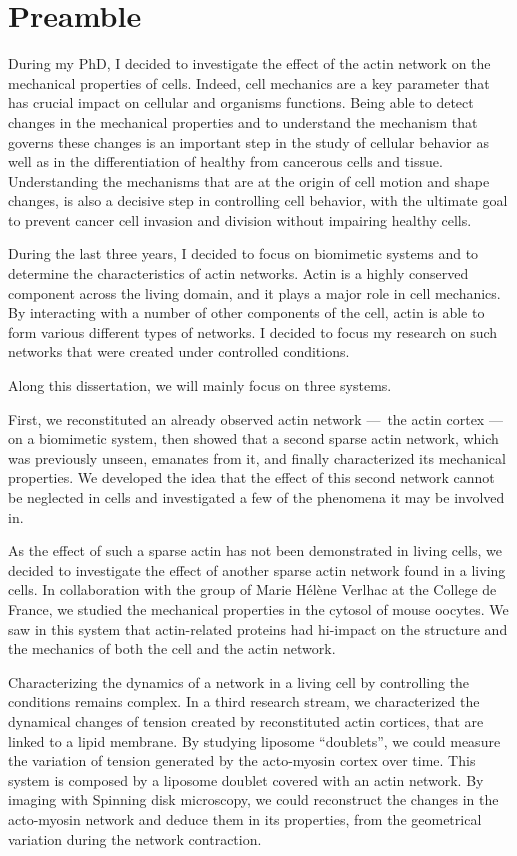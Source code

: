 \documentclass[A4paperpaper,11pt,english]{sphinxmanual}
\begin{document}
\chapter*{Preamble}
         
\label{index-latex::doc}\label{index-latex:preamble}
During my PhD, I decided to investigate the effect of the actin network on the
mechanical properties of cells. Indeed, cell mechanics are a key parameter that
has crucial impact on cellular and organisms functions. Being able to detect
changes in the mechanical properties and to understand the mechanism that
governs these changes is an important step in the study of cellular behavior as
well as in the differentiation of healthy from cancerous cells and tissue.
Understanding the mechanisms that are at the origin of cell motion and shape
changes, is also a decisive step in controlling cell behavior, with the ultimate
goal to prevent cancer cell invasion and division without impairing healthy
cells.

During the last three years, I decided to focus on biomimetic systems and
to determine the characteristics of actin networks. Actin is a highly conserved
component across the living domain, and it plays a major role in cell
mechanics. By interacting with a number of other components of the cell, actin
is able to form various different types of networks. I decided to focus my research on such networks that were created under
controlled conditions.

Along this dissertation, we will mainly focus on three systems.

First, we reconstituted an already observed actin network — the actin
cortex — on a biomimetic system, then showed that a
second sparse actin network, which was previously unseen, emanates from it, and finally characterized its mechanical
properties. We developed the idea that the effect of this second network cannot
be neglected in cells and investigated a few of the phenomena it may be involved
in.

As the effect of such a sparse actin has not been demonstrated in living cells, we decided to
investigate the effect of another sparse actin network found in a living cells. In
collaboration with the group of Marie Hélène Verlhac at the College de France, we studied the mechanical properties
in the cytosol of mouse oocytes. We saw in this system that actin-related proteins had
hi-impact on the structure and the mechanics of both the cell and the actin
network.

Characterizing the dynamics of a network in a living cell by controlling the
conditions remains complex.  In a third research stream, we characterized the dynamical changes of tension created by reconstituted actin
cortices, that are linked to a lipid
membrane. By studying liposome ``doublets'', we could measure the variation of tension generated by the acto-myosin cortex over
time. This system is composed by a liposome doublet covered with
an actin network. By imaging with Spinning disk microscopy, we could
reconstruct the changes in the acto-myosin network and deduce them in its
properties, from the geometrical variation during the network contraction.
\end{document}
